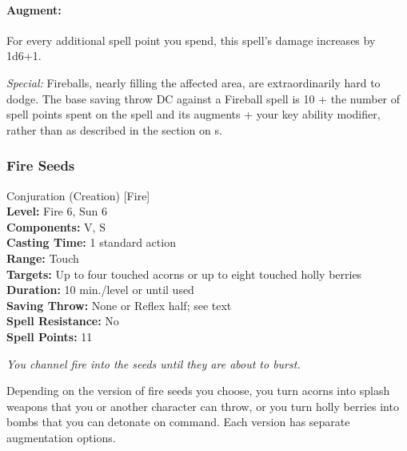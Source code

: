 \paragraph{Augment:} For every additional spell point you spend, this spell's damage increases by 1d6+1.

\emph{Special:} Fireballs, nearly filling the affected area, are extraordinarily hard to dodge. The base saving throw DC against a Fireball spell is 10 + the number of spell points spent on the spell and its augments + your key ability modifier, 
rather than as described in the section on s.
\subsubsection{Fire Seeds}
\label{Spell:FireSeeds}
Conjuration (Creation) [Fire]
\\ \textbf{Level:} Fire 6, Sun 6
\\ \textbf{Components:} V, S
\\ \textbf{Casting Time:} 1 standard action
\\ \textbf{Range:} Touch
\\ \textbf{Targets:} Up to four touched acorns or up to eight touched holly berries
\\ \textbf{Duration:} 10 min./level or until used
\\ \textbf{Saving Throw:} None or Reflex half; see text
\\ \textbf{Spell Resistance:} No
\\ \textbf{Spell Points:} 11

\emph{You channel fire into the seeds until they are about to burst.}

Depending on the version of fire seeds you choose, you turn acorns into splash weapons that you or another character can throw, or you turn holly berries into bombs that you can detonate on command. Each version has separate augmentation options.

